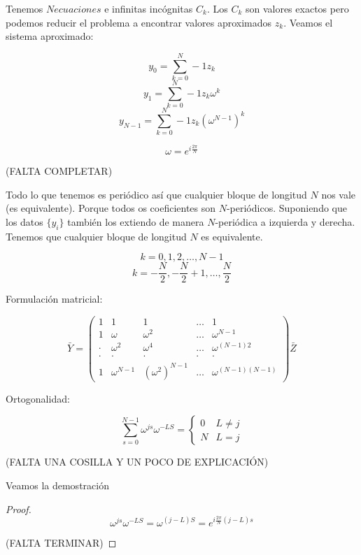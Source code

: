 			Tenemos $N ecuaciones$ e infinitas incógnitas $C_k$. Los $C_k$ son valores exactos pero podemos reducir el problema a encontrar valores aproximados $z_k$. Veamos el sistema aproximado:

			\[y_0 = \sum_{k=0}^N-1 z_k\]
			\[y_1 = \sum_{k=0}^N-1 z_k \omega^k\]
			\[y_{N-1} = \sum_{k=0}^N-1 z_k \left(\omega^{N-1}\right)^k\]


			\obs
			\[ \omega = e^{i \frac{2\pi}{N}}  \]

			(FALTA COMPLETAR)


			Todo lo que tenemos es periódico así que cualquier bloque de longitud $N$ nos vale (es equivalente). Porque todos os coeficientes son $N$-periódicos. Suponiendo que los datos $\{y_i\}$ también los extiendo de manera $N$-periódica a izquierda y derecha. Tenemos que cualquier bloque de longitud $N$ es equivalente.

			\[k=0,1,2,…,N-1\]
			\[k = -\frac{N}{2}, -\frac{N}{2}+1, … , \frac{N}{2}\]


			Formulación matricial:

			\[ \bar{Y} = \left(
			\begin{matrix}
				1 & 1 & 1 & … & 1 \\
				1 & \omega & \omega^2 & … & \omega^{N-1} \\
				· & \omega^2 & \omega^4 & … & \omega^{(N-1)2} \\
				· & · & · & · & · \\
				1 & \omega^{N-1} & (\omega^2)^{N-1} & … & \omega^{(N-1)(N-1)}
			\end{matrix} \right) \bar{Z}
			\]

			Ortogonalidad:

			\[ \sum_{s=0}^{N-1} \omega^{js} \omega^{-LS} = \begin{cases}
			0 & L \neq j\\
			N & L = j
			\end{cases} \]

			(FALTA UNA COSILLA Y UN POCO DE EXPLICACIÓN)

			Veamos la demostración

			\begin{proof}

			\[ \omega^{js} \omega^{-LS} = \omega^{(j-L)S} = e^{i\frac{2\pi}{N}(j-L)s}  \]

			(FALTA TERMINAR)

			\end{proof}



